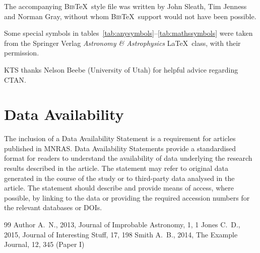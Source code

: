 \documentclass[fleqn,usenatbib,useAMS]{mnras}
\newcommand{\bibtex}{\textsc{Bib}\!\TeX} %
\begin{document}
The accompanying \bibtex\ style file was written by John Sleath, Tim Jenness and Norman Gray, without whom \bibtex\ support would not have been possible.

Some special symbols in tables~\ref{tab:anysymbols}--\ref{tab:mathssymbols} were taken from the Springer Verlag \textit{Astronomy \& Astrophysics} \LaTeX\ class, with their permission.

KTS thanks Nelson Beebe (University of Utah) for helpful advice regarding CTAN.


\section*{Data Availability}

 
The inclusion of a Data Availability Statement is a requirement for articles published in MNRAS. Data Availability Statements provide a standardised format for readers to understand the availability of data underlying the research results described in the article. The statement may refer to original data generated in the course of the study or to third-party data analysed in the article. The statement should describe and provide means of access, where possible, by linking to the data or providing the required accession numbers for the relevant databases or DOIs.




%


\begin{thebibliography}{99}
Author A.~N., 2013, Journal of Improbable Astronomy, 1, 1
Jones C.~D., 2015, Journal of Interesting Stuff, 17, 198
Smith A.~B., 2014, The Example Journal, 12, 345 (Paper I)
\end{thebibliography}



\end{document}
